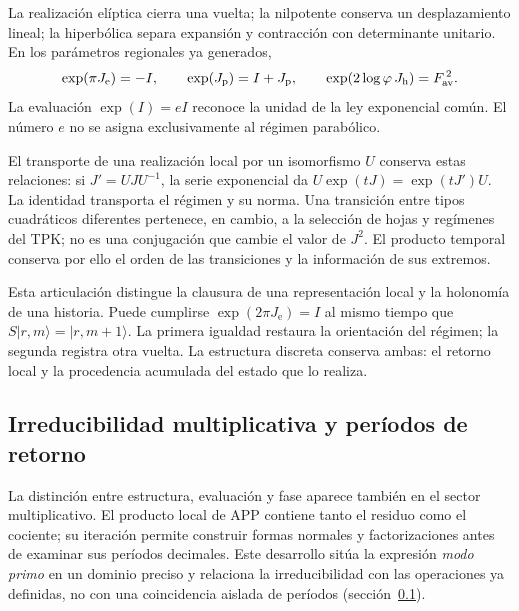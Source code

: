 La realización elíptica cierra una vuelta; la nilpotente conserva un
desplazamiento lineal; la hiperbólica separa expansión y contracción con
determinante unitario. En los parámetros regionales ya generados,
\[
 \exp(\pi J_{\mathrm e})=-I,\qquad
 \exp(J_{\mathrm p})=I+J_{\mathrm p},\qquad
 \exp(2\log\varphi\,J_{\mathrm h})=F_{\rm av}^{\,2}.
\]
La evaluación \(\exp(I)=eI\) reconoce la unidad de la ley exponencial
común. El número \(e\) no se asigna exclusivamente al régimen parabólico.

El transporte de una realización local por un isomorfismo \(U\) conserva
estas relaciones: si \(J'=UJU^{-1}\), la serie exponencial da
\(U\exp(tJ)=\exp(tJ')U\). La identidad transporta el régimen y su
norma. Una transición entre tipos cuadráticos diferentes pertenece, en
cambio, a la selección de hojas y regímenes del TPK; no es una conjugación
que cambie el valor de \(J^2\). El producto temporal conserva por ello el
orden de las transiciones y la información de sus extremos.

Esta articulación distingue la clausura de una representación local y la
holonomía de una historia. Puede cumplirse \(\exp(2\pi J_{\mathrm e})=I\)
al mismo tiempo que \(S|r,m\rangle=|r,m+1\rangle\). La primera igualdad
restaura la orientación del régimen; la segunda registra otra vuelta. La
estructura discreta conserva ambas: el retorno local y la procedencia
acumulada del estado que lo realiza.




\subsection{Irreducibilidad multiplicativa y períodos de retorno}
\label{x_reciprocidad:primos-retornos}

La distinción entre estructura, evaluación y fase aparece también en el
sector multiplicativo. El producto local de APP contiene tanto el residuo
como el cociente; su iteración permite construir formas normales y
factorizaciones antes de examinar sus períodos decimales. Este desarrollo
sitúa la expresión \emph{modo primo} en un dominio preciso y relaciona la
irreducibilidad con las operaciones ya definidas, no con una coincidencia
aislada de períodos (sección~\ref{x_reciprocidad:primos-retornos}).


